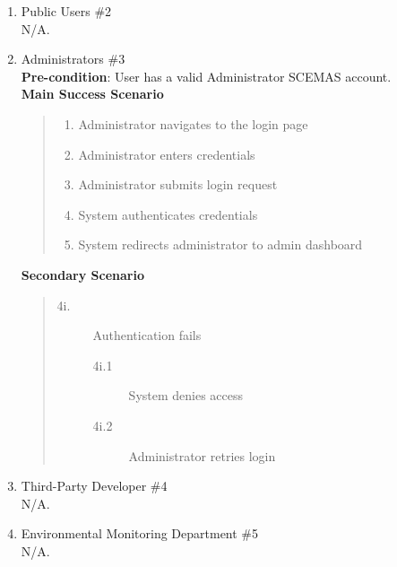 \documentclass[]{article}
\begin{document}
\begin{enumerate}[{\bf BE10.}]
\begin{enumerate}[{\bf VP1.}]
            \item Public Users \#2\\
                N/A.

            \item Administrators \#3\\
                \textbf{Pre-condition}: User has a valid Administrator SCEMAS account.\\
                \textbf{Main Success Scenario}
                \begin{quote}
                    \begin{enumerate}[1.]
                        \item Administrator navigates to the login page
                        \item Administrator enters credentials
                        \item Administrator submits login request
                        \item System authenticates credentials
                        \item System redirects administrator to admin dashboard
                    \end{enumerate}
                \end{quote}
                \textbf{Secondary Scenario}
                \begin{quote}
                    \begin{description}
                        \item[\textmd{4i.}] Authentication fails
                        \begin{description}
                            \item[\textmd{4i.1}] System denies access
                            \item[\textmd{4i.2}] Administrator retries login
                        \end{description}
                    \end{description}
                \end{quote}

            \item Third-Party Developer \#4\\
                N/A.

            \item Environmental Monitoring Department \#5\\
                N/A.


\end{enumerate}
\end{enumerate}
\end{document}
